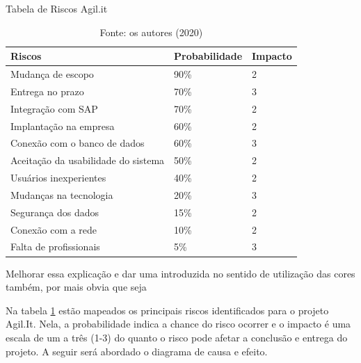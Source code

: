{	\begin{table}[]
		\caption{\label{tebela_risco} Tabela de Riscos Agil.it}
		\begin{tabular}{l|l|l}
			\hline
			\rowcolor[HTML]{EFEFEF} 
			\textbf{Riscos}                     & \textbf{Probabilidade} & \textbf{Impacto} \\ \hline
			\rowcolor[HTML]{DD7346} 
			Mudança de escopo                   & 90\%                   & 2                \\ \hline
			\rowcolor[HTML]{DD7346} 
			Entrega no prazo                    & 70\%                   & 3                \\ \hline
			\rowcolor[HTML]{DD7346} 
			Integração com SAP                  & 70\%                   & 2                \\ \hline
			\rowcolor[HTML]{FFFE65} 
			Implantação na empresa              & 60\%                   & 2                \\ \hline
			\rowcolor[HTML]{FFFE65} 
			Conexão com o banco de dados        & 60\%                   & 3                \\ \hline
			\rowcolor[HTML]{FFFE65} 
			Aceitação da usabilidade do sistema & 50\%                   & 2                \\ \hline
			\rowcolor[HTML]{FFFE65} 
			Usuários inexperientes              & 40\%                   & 2                \\ \hline
			\rowcolor[HTML]{9AFF99} 
			Mudanças na tecnologia              & 20\%                   & 3                \\ \hline
			\rowcolor[HTML]{9AFF99} 
			Segurança dos dados                 & 15\%                   & 2                \\ \hline
			\rowcolor[HTML]{9AFF99} 
			Conexão com a rede                  & 10\%                   & 2                \\ \hline
			\rowcolor[HTML]{9AFF99} 
			Falta de profissionais              & 5\%                    & 3                \\ \hline
		\end{tabular}
		\caption{Fonte: os autores (2020)}
	\end{table}
	
	
	{\color{red} Melhorar essa explicação e dar uma introduzida no sentido de utilização das cores também, por mais obvia que seja}
	
	Na tabela \ref{tebela_risco} estão mapeados os principais riscos identificados para o projeto Agil.It. Nela, a probabilidade indica a chance do risco ocorrer e o impacto é uma escala de um a três (1-3) do quanto o risco pode afetar a conclusão e entrega do projeto. A seguir será abordado o diagrama de causa e efeito.
	
}
